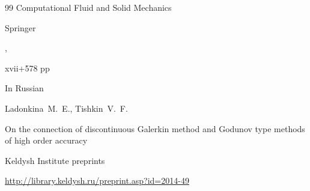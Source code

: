 \begin{thebibliography}{99}
\serial  Computational Fluid and Solid Mechanics

\publ Springer

,


xvii+578 pp









\lang In Russian

\by Ladonkina~M.~E., Tishkin~V.~F.

\paper On the connection of discontinuous Galerkin method and Godunov type methods of high order accuracy

\jour Keldysh Institute preprints




\elink \url{http://library.keldysh.ru/preprint.asp?id=2014-49}





\end{thebibliography}



\EngDate



\renewcommand{\baselinestretch}{0.9}





\newpage

\Russian



%

%

